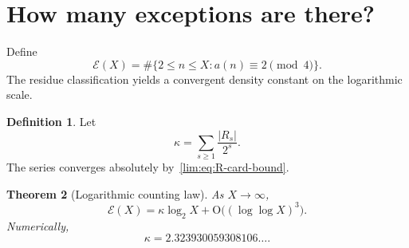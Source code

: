 \documentclass[11pt]{article}
\newtheorem{theorem}{Theorem}[section]
\theoremstyle{definition}
\newtheorem{definition}[theorem]{Definition}
\theoremstyle{remark}
\newcommand{\Oh}{\mathrm O}
\begin{document}
\section{How many exceptions are there?}

Define
\begin{equation}\label{lim:eq:E-X}
  \mathcal E(X)=\#\{2\le n\le X:a(n)\equiv2\pmod4\}.
\end{equation}
The residue classification yields a convergent density constant on the
logarithmic scale.

\begin{definition}
\label{lim:def:kappa}
Let
\begin{equation}\label{lim:eq:kappa}
  \kappa=\sum_{s\ge1}\frac{|R_s|}{2^s}.
\end{equation}
The series converges absolutely by~\eqref{lim:eq:R-card-bound}.
\end{definition}

\begin{theorem}[Logarithmic counting law]
\label{lim:thm:counting-law}
As $X\to\infty$,
\begin{equation}\label{lim:eq:counting-law}
  \mathcal E(X)
  =\kappa\log_2X+\Oh\bigl((\log\log X)^3\bigr).
\end{equation}
Numerically,
\begin{equation}\label{lim:eq:kappa-decimal}
  \kappa=2.323930059308106\ldots.
\end{equation}
\end{theorem}
\end{document}
